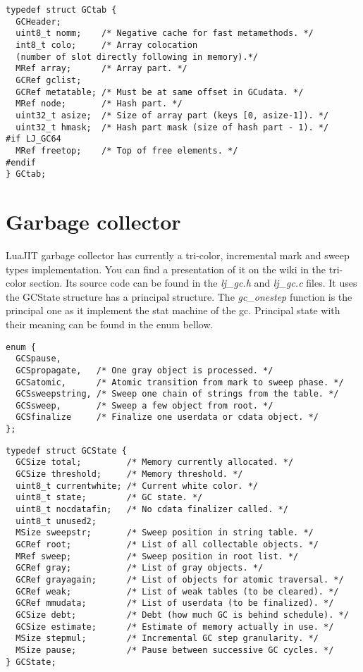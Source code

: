 \begin{lstlisting}[style=CStyle]
typedef struct GCtab {
  GCHeader;
  uint8_t nomm;    /* Negative cache for fast metamethods. */
  int8_t colo;     /* Array colocation
  (number of slot directly following in memory).*/
  MRef array;      /* Array part. */
  GCRef gclist;
  GCRef metatable; /* Must be at same offset in GCudata. */
  MRef node;       /* Hash part. */
  uint32_t asize;  /* Size of array part (keys [0, asize-1]). */
  uint32_t hmask;  /* Hash part mask (size of hash part - 1). */
#if LJ_GC64
  MRef freetop;    /* Top of free elements. */
#endif
} GCtab;
\end{lstlisting}

\section{Garbage collector}
\label{Sec:gc}

LuaJIT garbage collector has currently a tri-color, incremental mark and sweep
types implementation. You can find a presentation of it on the wiki
\cite{luajit-gc} in the tri-color section. Its source code can be found in the
\emph{lj\_gc.h} and \emph{lj\_gc.c} files. It uses the GCState structure has a
principal structure. The \emph{gc\_onestep} function is the principal one as it
implement the stat machine of the gc. Principal state with their meaning can be
found in the enum bellow.

\begin{lstlisting}[style=CStyle]
enum {
  GCSpause,
  GCSpropagate,   /* One gray object is processed. */
  GCSatomic,      /* Atomic transition from mark to sweep phase. */
  GCSsweepstring, /* Sweep one chain of strings from the table. */
  GCSsweep,       /* Sweep a few object from root. */
  GCSfinalize     /* Finalize one userdata or cdata object. */
};
\end{lstlisting}

\begin{lstlisting}[style=CStyle]
typedef struct GCState {
  GCSize total;         /* Memory currently allocated. */
  GCSize threshold;     /* Memory threshold. */
  uint8_t currentwhite; /* Current white color. */
  uint8_t state;        /* GC state. */
  uint8_t nocdatafin;   /* No cdata finalizer called. */
  uint8_t unused2;
  MSize sweepstr;       /* Sweep position in string table. */
  GCRef root;           /* List of all collectable objects. */
  MRef sweep;           /* Sweep position in root list. */
  GCRef gray;           /* List of gray objects. */
  GCRef grayagain;      /* List of objects for atomic traversal. */
  GCRef weak;           /* List of weak tables (to be cleared). */
  GCRef mmudata;        /* List of userdata (to be finalized). */
  GCSize debt;          /* Debt (how much GC is behind schedule). */
  GCSize estimate;      /* Estimate of memory actually in use. */
  MSize stepmul;        /* Incremental GC step granularity. */
  MSize pause;          /* Pause between successive GC cycles. */
} GCState;
\end{lstlisting}

